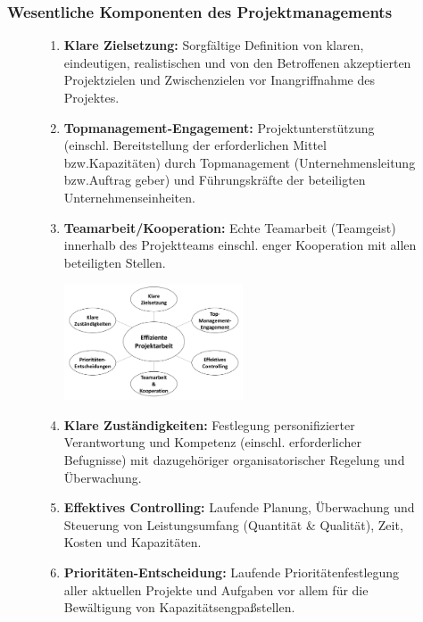 \documentclass[11pt,a4paper]{article}
\begin{document}
\subsubsection{Wesentliche Komponenten des Projektmanagements}
	\begin{figure}[H]
	\begin{enumerate}
	\itemsep0em
		\item \textbf{Klare Zielsetzung:} Sorgfältige Definition von klaren, eindeutigen, realistischen und von den Betroffenen akzeptierten Projektzielen und Zwischenzielen vor Inangriffnahme des Projektes.
		\item \textbf{Topmanagement-Engagement:} Projektunterstützung (einschl. Bereitstellung der erforderlichen Mittel
bzw.Kapazitäten) durch Topmanagement (Unternehmensleitung bzw.Auftrag
geber) und Führungskräfte der beteiligten Unternehmenseinheiten.
	
	\item \textbf{Teamarbeit/Kooperation:} Echte Teamarbeit (Teamgeist) innerhalb des Projektteams einschl. enger
Kooperation mit allen beteiligten Stellen.
\begin{center}
\includegraphics[width=0.5\textwidth]{effiizienteprojektarbeit}
\end{center}


	\item \textbf{Klare Zuständigkeiten:} Festlegung personifizierter Verantwortung und Kompetenz (einschl.
erforderlicher Befugnisse) mit dazugehöriger organisatorischer Regelung
und Überwachung.

	\item \textbf{Effektives Controlling:} Laufende Planung, Überwachung und Steuerung von Leistungsumfang
(Quantität \& Qualität), Zeit, Kosten und Kapazitäten.

	\item \textbf{Prioritäten-Entscheidung:} Laufende Prioritätenfestlegung aller aktuellen Projekte und Aufgaben
vor allem für die Bewältigung von Kapazitätsengpaßstellen.
	\end{enumerate}
	\end{figure}
\end{document}
